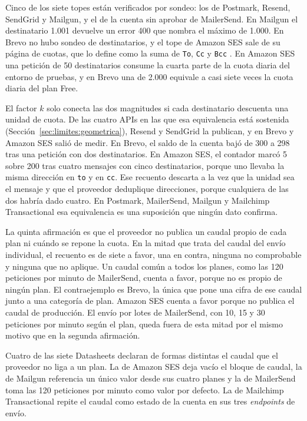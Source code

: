 Cinco de los siete topes están verificados por sondeo: los de Postmark, Resend, SendGrid y Mailgun, y el de la cuenta sin aprobar de MailerSend.
En Mailgun el destinatario 1.001 devuelve un error 400 que nombra el máximo de 1.000.
En Brevo no hubo sondeo de destinatarios, y el tope de Amazon SES sale de su página de cuotas, que lo define como la suma de \texttt{To}, \texttt{Cc} y \texttt{Bcc} \citep{sesdocs}.
En Amazon SES una petición de 50 destinatarios consume la cuarta parte de la cuota diaria del entorno de pruebas, y en Brevo una de 2.000 equivale a casi siete veces la cuota diaria del plan Free.

El factor $k$ solo conecta las dos magnitudes si cada destinatario descuenta una unidad de cuota.
De las cuatro APIs en las que esa equivalencia está sostenida (Sección~\ref{sec:limites:geometrica}), Resend y SendGrid la publican, y en Brevo y Amazon SES salió de medir.
En Brevo, el saldo de la cuenta bajó de 300 a 298 tras una petición con dos destinatarios.
En Amazon SES, el contador marcó 5 sobre 200 tras cuatro mensajes con cinco destinatarios, porque uno llevaba la misma dirección en \texttt{to} y en \texttt{cc}.
Ese recuento descarta a la vez que la unidad sea el mensaje y que el proveedor deduplique direcciones, porque cualquiera de las dos habría dado cuatro.
En Postmark, MailerSend, Mailgun y Mailchimp Transactional esa equivalencia es una suposición que ningún dato confirma.

La quinta afirmación es que el proveedor no publica un caudal propio de cada plan ni cuándo se repone la cuota.
En la mitad que trata del caudal del envío individual, el recuento es de siete a favor, una en contra, ninguna no comprobable y ninguna que no aplique.
Un caudal común a todos los planes, como las 120 peticiones por minuto de MailerSend, cuenta a favor, porque no es propio de ningún plan.
El contraejemplo es Brevo, la única que pone una cifra de ese caudal junto a una categoría de plan.
Amazon SES cuenta a favor porque no publica el caudal de producción.
El envío por lotes de MailerSend, con 10, 15 y 30 peticiones por minuto según el plan, queda fuera de esta mitad por el mismo motivo que en la segunda afirmación.

Cuatro de las siete Datasheets declaran de formas distintas el caudal que el proveedor no liga a un plan.
La de Amazon SES deja vacío el bloque de caudal, la de Mailgun referencia un único valor desde sus cuatro planes y la de MailerSend toma las 120 peticiones por minuto como valor por defecto.
La de Mailchimp Transactional repite el caudal como estado de la cuenta en sus tres \textit{endpoints} de envío.

